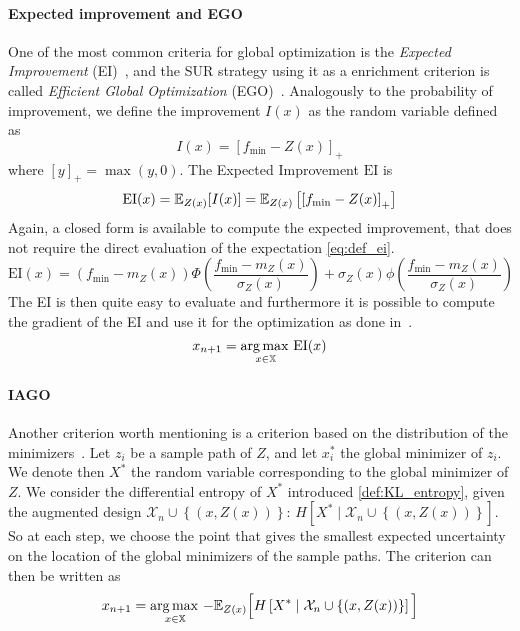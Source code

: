 \documentclass[../../Main_ManuscritThese.tex]{subfiles}
\begin{document}
\paragraph{Expected improvement and EGO}
One of the most common criteria for global optimization is the \emph{Expected Improvement} (EI)~\cite{mockus_bayesian_1974}, and the SUR strategy using it as a enrichment criterion is called \emph{Efficient Global Optimization} (EGO)~\cite{jones_efficient_1998}.
Analogously to the probability of improvement, we define the improvement $I(x)$ as the random variable defined as
\begin{equation}
  \label{eq:def_improvement}
  I(x) = {\left[f_{\min} - Z(x)\right]}_+
\end{equation}
where $[y]_+ = \max(y, 0)$.
The Expected Improvement $\mathrm{EI}$ is 
\begin{align}
  \label{eq:def_ei}
  \mathrm{EI}(x) = \mathbb{E}_{Z(x)}[I(x)]  = \mathbb{E}_{Z(x)}\left[\left[f_{\min} - Z(x) \right]_+\right]
\end{align}
Again, a closed form is available to compute the expected improvement, that does not require the direct evaluation of the expectation \cref{eq:def_ei}.
\begin{equation}
  \mathrm{EI}(x) = \left(f_{\min} - m_Z(x)\right) \Phi\left(\frac{f_{\min} - m_Z(x)}{\sigma_Z(x)}\right) + \sigma_Z(x) \phi\left(\frac{f_{\min} - m_Z(x)}{\sigma_Z(x)}\right)
\end{equation}
The EI is then quite easy to evaluate and furthermore it is possible to compute the gradient of the EI and use it for the optimization as done in~\cite{pardalos_differentiating_2015}.
\begin{equation}
  x_{n+1} = \operatorname*{arg\,max \,}_{x\in \mathbb{X}} \mathrm{EI}(x)
\end{equation}

\paragraph{IAGO}
\label{ssec:IAGO} Another criterion worth mentioning is a criterion based on the distribution of the minimizers~\cite{villemonteix_informational_2006,hennig_entropy_2011}.
Let $z_i$ be a sample path of $Z$, and let $x_i^*$ the global minimizer of $z_i$.
We denote then $X^*$ the random variable corresponding to the global minimizer of $Z$.
We consider the differential entropy of $X^*$ introduced \cref{def:KL_entropy}, given the augmented design $\mathcal{X}_n \cup \left\{\left(x,Z(x)\right)\right\}$: $H[X^*\mid \mathcal{X}_n \cup \left\{(x, Z(x))\right\}]$.
 So at each step, we choose the point that gives the smallest expected uncertainty on the location of the global minimizers of the sample paths.
The criterion can then be written as
\begin{equation}
  x_{n+1}= \operatorname*{arg\,max \,}_{x \in \mathbb{X}} -\mathbb{E}_{Z(x)}\Big[H\left[X^* \mid \mathcal{X}_n \cup \left\{(x, Z(x))\right\} \right]\Big]
\end{equation}
\end{document}
